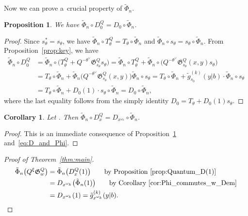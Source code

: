 \documentclass[10pt,a4paper]{amsart}
\numberwithin{equation}{section}
\newcommand{\Gro}[1]{\mathfrak{G}^Q_{#1}}
\newtheorem{Corollary}[Theorem]{Corollary}
\newtheorem{Proposition}[Theorem]{Proposition}
\theoremstyle{definition}
\begin{document}
Now we can prove a~crucial property of $\tilde{\Phi}_n$.
\begin{Proposition}\label{prop:Phi_D0} We have
$\tilde{\Phi}_n\circ D_0^{Q}=D_0\circ\tilde{\Phi}_n
$.
\end{Proposition}
\begin{proof}
Since $s_\theta^*=s_\theta$, we have $\tilde{\Phi}_n\circ T_\theta^Q
=T_\theta \circ \tilde{\Phi}_n$
and $\tilde{\Phi}_n\circ s_\theta
=s_\theta \circ \tilde{\Phi}_n$.
From Proposition~\ref{prop:key}, we have
\begin{align*}
\tilde{\Phi}_n\circ D_0^{Q}&=\tilde{\Phi}_n
\circ \bigl(T_\theta^{Q}+
Q^{-\theta^\vee}
\Gro{s_\theta}
s_\theta
\bigr)=\tilde{\Phi}_n\circ T_\theta^{Q}+
\tilde{\Phi}_n\circ\bigl(Q^{-\theta^\vee}
\Gro{s_\theta}(x,y)
s_\theta\bigr)\\
&=T_\theta\circ\tilde{\Phi}_n
+
\tilde{\Phi}_n\bigl(Q^{-\theta^\vee}
\Gro{s_\theta}(x,y)\bigr)
\tilde{\Phi}_n\circ
s_\theta=T_\theta\circ\tilde{\Phi}_n+
\tilde{g}_{s_0}^{(k)}(y|b)\cdot
\tilde{\Phi}_n\circ
s_\theta
\\
&=T_\theta\circ\tilde{\Phi}_n+
D_0(1)\cdot
s_\theta\circ \tilde{\Phi}_n=D_0\circ\tilde{\Phi}_n,
\end{align*}
where the last equality follows from the simply identity
$
D_0=T_\theta
+ D_0(1)
s_\theta$.
\end{proof}


\begin{Corollary}\label{cor:Phi_commutes_w_Dem}
Let . Then
$
\tilde{\Phi}_n\circ D_x^Q=
D_{x^{\omega_k}}
\circ \tilde{\Phi}_n$.
\end{Corollary}
\begin{proof}
This is an immediate consequence of Proposition~\ref{prop:Phi_D0} and~\eqref{eq:D_and_Phi}.
\end{proof}



\begin{proof}[Proof of Theorem~\ref{thm:main}]
 \begin{align*}
 \tilde{\Phi}_n\bigl(Q^\xi \Gro{w}\bigr)
&=
\tilde{\Phi}_n\bigl(D_x^Q(1)\bigr) \qquad \text{by Proposition~\ref{prop:Quantum_D(1)}}\\
&={D}_{x^{\omega_k}}\bigl(\tilde{\Phi}_n(1)\bigr) \qquad \text{by Corollary~\ref{cor:Phi_commutes_w_Dem}}\\
&={D}_{x^{\omega_k}}(1)=\tilde{g}_{x^{\omega_k}}^{(k)}(y|b).\tag*{\qed}
\end{align*} \renewcommand{\qed}{}
\end{proof}
\end{document}
